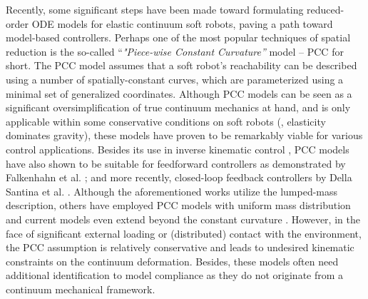 Recently, some significant steps have been made toward formulating reduced-order ODE models for elastic continuum soft robots, paving a path toward model-based controllers. Perhaps one of the most popular techniques of spatial reduction is the so-called ``\textit{"Piece-wise Constant Curvature''} model -- PCC for short. The PCC model assumes that a soft robot's reachability can be described using a number of spatially-constant curves, which are parameterized using a minimal set of generalized coordinates. Although PCC models can be seen as a significant oversimplification of true continuum mechanics at hand, and is only applicable within some conservative conditions on soft robots (\eg, elasticity dominates gravity), these models have proven to be remarkably viable for various control applications. Besides its use in inverse kinematic control \cite{Marchese2014,Marchese2016,Jones2006}, PCC models have also shown to be suitable for feedforward controllers as demonstrated by Falkenhahn et al. \cite{Falkenhahn2015}; and more recently, closed-loop feedback controllers by Della Santina et al. \cite{DellaSantina2020,Katzschmann2019}. Although the aforementioned works utilize the lumped-mass description, others have employed PCC models with uniform mass distribution \cite{Renda2018,Godage2015,Godage2016,Tatlicioglu2007,Tatlicioglu2007a} and current models even extend beyond the constant curvature \cite{Mochiyama2003,Chirikjian1994,DellaSantina2020}. However, in the face of significant external loading or (distributed) contact with the environment, the PCC assumption is relatively conservative and leads to undesired kinematic constraints on the continuum deformation. Besides, these models often need additional identification to model compliance as they do not originate from a continuum mechanical framework.

